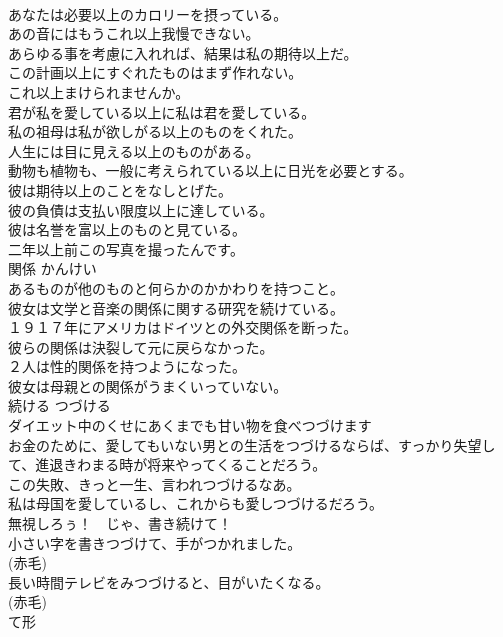 \documentclass[8pt]{extreport}
\begin{document}
\begin{CJK}{UTF8}{min}
\\	あなたは必要以上のカロリーを摂っている。  
\\	あの音にはもうこれ以上我慢できない。  
\\	あらゆる事を考慮に入れれば、結果は私の期待以上だ。  
\\	この計画以上にすぐれたものはまず作れない。  
\\	これ以上まけられませんか。  
\\	君が私を愛している以上に私は君を愛している。  
\\	私の祖母は私が欲しがる以上のものをくれた。  
\\	人生には目に見える以上のものがある。  
\\	動物も植物も、一般に考えられている以上に日光を必要とする。  
\\	彼は期待以上のことをなしとげた。  
\\	彼の負債は支払い限度以上に達している。  
\\	彼は名誉を富以上のものと見ている。  
\\	二年以上前この写真を撮ったんです。  
\\	関係	かんけい	
\\	あるものが他のものと何らかのかかわりを持つこと。	
\\	彼女は文学と音楽の関係に関する研究を続けている。  
\\	１９１７年にアメリカはドイツとの外交関係を断った。  
\\	彼らの関係は決裂して元に戻らなかった。  
\\	２人は性的関係を持つようになった。  
\\	彼女は母親との関係がうまくいっていない。  
\\	続ける	つづける	
\\	ダイエット中のくせにあくまでも甘い物を食べつづけます  
\\	お金のために、愛してもいない男との生活をつづけるならば、すっかり失望して、進退きわまる時が将来やってくることだろう。  
\\	この失敗、きっと一生、言われつづけるなあ。  
\\	私は母国を愛しているし、これからも愛しつづけるだろう。  
\\	無視しろぅ！　じゃ、書き続けて！  
\\	小さい字を書きつづけて、手がつかれました。  
\\	(赤毛)
\\	長い時間テレビをみつづけると、目がいたくなる。  
\\	(赤毛)
\\	て形

\end{CJK}
\end{document}

